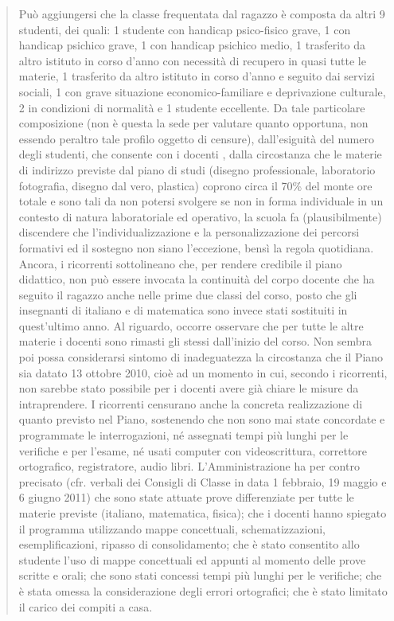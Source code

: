 \begin{quote}
\begin{description}
Può aggiungersi che la classe frequentata dal ragazzo è composta da altri 9 studenti, dei quali: 1 studente con handicap psico-fisico grave, 1 con handicap psichico grave, 1 con handicap psichico medio, 1 trasferito da altro istituto in corso d'anno con necessità di recupero in quasi tutte le materie, 1 trasferito da altro istituto in corso d'anno e seguito dai servizi sociali, 1 con grave situazione economico-familiare e deprivazione culturale, 2 in condizioni di normalità e 1 studente eccellente. Da tale particolare composizione (non è questa la sede per valutare quanto opportuna, non essendo peraltro tale profilo oggetto di censure), dall'esiguità del numero degli studenti, che consente con i docenti , dalla circostanza che le materie di indirizzo previste dal piano di studi (disegno professionale, laboratorio fotografia, disegno dal vero, plastica) coprono circa il 70\% del monte ore totale e sono tali da non potersi svolgere se non in forma individuale in un contesto di natura laboratoriale ed operativo, la scuola fa (plausibilmente) discendere che l'individualizzazione e la personalizzazione dei percorsi formativi ed il sostegno non siano l'eccezione, bensì la regola quotidiana.
Ancora, i ricorrenti sottolineano che, per rendere credibile il piano didattico, non può essere invocata la continuità del corpo docente che ha seguito il ragazzo anche nelle prime due classi del corso, posto che gli insegnanti di italiano e di matematica sono invece stati sostituiti in quest'ultimo anno.
Al riguardo, occorre osservare che per tutte le altre materie i docenti sono rimasti gli stessi dall'inizio del corso.
Non sembra poi possa considerarsi sintomo di inadeguatezza la circostanza che il Piano sia datato 13 ottobre 2010, cioè ad un momento in cui, secondo i ricorrenti, non sarebbe stato possibile per i docenti avere già chiare le misure da intraprendere.
I ricorrenti censurano anche la concreta realizzazione di quanto previsto nel Piano, sostenendo che non sono mai state concordate e programmate le interrogazioni, né assegnati tempi più lunghi per le verifiche e per l'esame, né usati computer con videoscrittura, correttore ortografico, registratore, audio libri.
L'Amministrazione ha per contro precisato (cfr. verbali dei Consigli di Classe in data 1 febbraio, 19 maggio e 6 giugno 2011) che sono state attuate prove differenziate per tutte le materie previste (italiano, matematica, fisica); che i docenti hanno spiegato il programma utilizzando mappe concettuali, schematizzazioni, esemplificazioni, ripasso di consolidamento; che è stato consentito allo studente l'uso di mappe concettuali ed appunti al momento delle prove scritte e orali; che sono stati concessi tempi più lunghi per le verifiche; che è stata omessa la considerazione degli errori ortografici; che è stato limitato il carico dei compiti a casa.

\end{description}
\end{quote}
